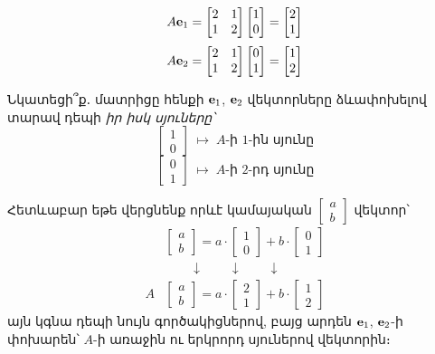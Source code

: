 \[
A\mathbf{e}_1 = \begin{bmatrix}
    2&1\\1&2
\end{bmatrix}\begin{bmatrix}
    1 \\ 0
\end{bmatrix}
=\begin{bmatrix}
    2 \\ 1
\end{bmatrix}
\]
\[
A\mathbf{e}_2 = \begin{bmatrix}
    2&1\\1&2
\end{bmatrix}\begin{bmatrix}
    0 \\ 1
\end{bmatrix}
=\begin{bmatrix}
    1 \\ 2
\end{bmatrix}
\]

Նկատեցի՞ք․ մատրիցը հենքի $\mathbf{e}_1$, $\mathbf{e}_2$ վեկտորները ձևափոխելով տարավ դեպի \textit{իր իսկ սյուները՝}
\[
\begin{bmatrix}
    1 \\ 0
\end{bmatrix} \; \mapsto \; A\text{-ի } 1\text{-ին սյունը}
\]
\[
\begin{bmatrix}
    0 \\ 1
\end{bmatrix} \; \mapsto \; A\text{-ի } 2\text{-րդ սյունը}
\]

Հետևաբար եթե վերցնենք որևէ կամայական $\begin{bmatrix}
    a\\b
\end{bmatrix}$ վեկտոր՝
\begin{align*}
&\begin{bmatrix}a \\ b\end{bmatrix} = a\cdot 
\begin{bmatrix}1 \\ 0\end{bmatrix} + 
b\cdot \begin{bmatrix}0 \\ 1\end{bmatrix} \\
& \qquad \downarrow \qquad \downarrow \qquad  \downarrow \qquad \\
A&\begin{bmatrix}a \\ b\end{bmatrix} = a\cdot 
\begin{bmatrix}2 \\ 1\end{bmatrix} + 
b\cdot \begin{bmatrix}1 \\ 2\end{bmatrix} 
\end{align*}
այն կգնա դեպի նույն գործակիցներով, բայց արդեն $\mathbf{e}_1$, $\mathbf{e}_2$-ի փոխարեն՝ $A$-ի առաջին ու երկրորդ սյուներով վեկտորին։ 

